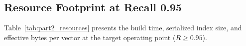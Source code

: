 \documentclass[10pt,twocolumn,a4paper]{article}
\begin{document}
\begin{table}[t]
\centering
\small
\caption{QPS at recall targets (Part 2). For each index the fastest setting whose recall on the tuning half reaches the target is chosen; its QPS on the reporting half is shown.}
\label{tab:part2_qps}
\end{table}

\subsection{Resource Footprint at Recall 0.95}
Table~\ref{tab:part2_resources} presents the build time, serialized index size, and effective bytes per vector at the target operating point ($R \ge 0.95$).
\end{document}
